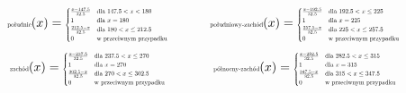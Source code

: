 \documentclass{article}
\begin{document}
\begin{equation*}
\begin{minipage}{0.5\textwidth}
\centering
$\text{\scalebox{0.5}{południe}}(x) =
\scalebox{0.5}{$
\begin{cases}
\frac{x - 147.5}{32.5} & \text{dla } 147.5 < x < 180 \\
1 & \text{dla } x = 180 \\
\frac{212.5 - x}{32.5} & \text{dla } 180 < x \leq 212.5 \\
0 & \text{w przeciwnym przypadku}
\end{cases}
$}$
\end{minipage}%
\begin{minipage}{0.5\textwidth}
\centering
$\text{\scalebox{0.5}{południowy-zachód}}(x) =
\scalebox{0.5}{$
\begin{cases}
\frac{x - 192.5}{32.5} & \text{dla } 192.5 < x \leq 225 \\
1 & \text{dla } x = 225 \\
\frac{257.5 - x}{32.5} & \text{dla } 225 < x \leq 257.5 \\
0 & \text{w przeciwnym przypadku}
\end{cases}
$}$
\end{minipage}
\end{equation*}
\begin{equation*}
\begin{minipage}{0.5\textwidth}
\centering
$\text{\scalebox{0.5}{zachód}}(x) =
\scalebox{0.5}{$
\begin{cases}
\frac{x - 237.5}{32.5} & \text{dla } 237.5 < x \leq 270 \\
1 & \text{dla } x = 270 \\
\frac{302.5 - x}{32.5} & \text{dla } 270 < x \leq 302.5 \\
0 & \text{w przeciwnym przypadku}
\end{cases}
$}$
\end{minipage}%
\begin{minipage}{0.5\textwidth}
\centering
$\text{\scalebox{0.5}{północny-zachód}}(x) =
\scalebox{0.5}{$
\begin{cases}
\frac{x - 282.5}{32.5} & \text{dla } 282.5 < x \leq 315 \\
1 & \text{dla } x = 315 \\
\frac{347.5 - x}{32.5} & \text{dla } 315 < x \leq 347.5 \\
0 & \text{w przeciwnym przypadku}
\end{cases}
$}$
\end{minipage}
\end{equation*}
\end{document}

